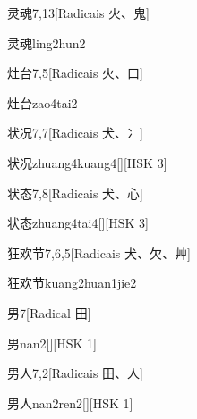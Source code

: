 \begin{entry}{灵魂}{7,13}[Radicais ⽕、⿁]
  \begin{phonetics}{灵魂}{ling2hun2}
  \end{phonetics}
\end{entry}

\begin{entry}{灶台}{7,5}[Radicais ⽕、⼝]
  \begin{phonetics}{灶台}{zao4tai2}
  \end{phonetics}
\end{entry}

\begin{entry}{状况}{7,7}[Radicais ⽝、⼎]
  \begin{phonetics}{状况}{zhuang4kuang4}[][HSK 3]
  \end{phonetics}
\end{entry}

\begin{entry}{状态}{7,8}[Radicais ⽝、⼼]
  \begin{phonetics}{状态}{zhuang4tai4}[][HSK 3]
  \end{phonetics}
\end{entry}

\begin{entry}{狂欢节}{7,6,5}[Radicais ⽝、⽋、⾋]
  \begin{phonetics}{狂欢节}{kuang2huan1jie2}
  \end{phonetics}
\end{entry}

\begin{entry}{男}{7}[Radical ⽥]
  \begin{phonetics}{男}{nan2}[][HSK 1]
  \end{phonetics}
\end{entry}

\begin{entry}{男人}{7,2}[Radicais ⽥、⼈]
  \begin{phonetics}{男人}{nan2ren2}[][HSK 1]
  \end{phonetics}
\end{entry}

